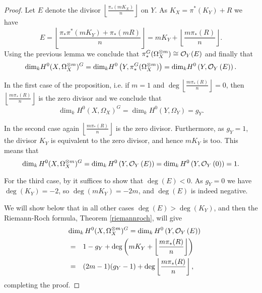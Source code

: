   \begin{proof}

    Let $E$ denote the divisor $\left\lfloor \frac{\pi_*(mK_X)}{n} \right\rfloor$ on $Y$. As $K_X=\pi^*(K_Y)+R$ we have
      \[ E = 
      \left \lfloor \frac{\pi_*\pi^*(mK_Y) + \pi_*(mR)}{n} \right \rfloor =
      mK_Y + \left \lfloor \frac{m\pi_*(R)}{n} \right \rfloor.\]
    Using the previous lemma we conclude that $\pi_*^G(\Omega_X^{\otimes m}) \cong {\cal O}_Y (E)$ and finally that
      \begin{equation*}
	\textrm{dim}_k H^0(X,\Omega_X^{\otimes m})^G 
	 = \textrm{dim}_k H^0\left(Y, \pi_*^G(\Omega_X^{\otimes m})\right)
	  = \textrm{dim}_k H^0\left(Y, {\cal O}_Y\left( E \right) \right).
      \end{equation*}


  In the first case of the proposition, i.e. if $m=1$ and $\deg \left\lfloor\frac{m\pi_*(R)}{n} \right\rfloor=0$, then $\left\lfloor\frac{m\pi_*(R)}{n} \right\rfloor$ is the zero divisor and we conclude that 
    \begin{equation*}
	\dim_kH^0(X,\Omega_X)^G = \dim_kH^0(Y, \Omega_Y) = g_Y.
    \end{equation*}


  In the second case again $\left\lfloor \frac{m\pi_*(R)}{n} \right\rfloor$ is the zero divisor. 
  Furthermore, as $g_Y=1$, the divisor $K_Y$ is equivalent to the zero divisor, and hence $mK_Y$ is too. 
  This means that
    \begin{equation*}
      \dim_kH^0(X,\Omega_X^{\otimes m})^G = \dim_kH^0\left( Y,{\cal O}_Y\left( E \right) \right) 
      = \dim_k  H^0\left( Y,{\cal O}_Y\left( 0 \right) \right)
      = 1.
    \end{equation*}


  For the third case, by \cite[Ex. 1.3.4, Ch IV]{hart} it suffices to show that $\deg \left( E \right) < 0$.
  As $g_Y=0$ we have $\deg(K_Y)=-2$, so $\deg(mK_Y)=-2m$, and $\deg \left( E \right)$ is indeed negative.



  We will show below that in all other cases $\deg(E) > \deg(K_Y)$, and then the Riemann-Roch formula, Theorem \ref{riemannroch}, will give 
     \begin{eqnarray*}
	\lefteqn{\dim_kH^0(X,\Omega_X^{\otimes m})^G = \dim_kH^0\left(Y,\cO_Y\left( E \right)\right)} \\
	& = & 1-g_Y+\deg\left(mK_Y+\left\lfloor{\frac{m\pi_*(R)}{n}}\right\rfloor\right) \\
	& = & (2m-1)(g_Y-1)+\deg\left\lfloor{\frac{m\pi_*(R)}{n}}\right\rfloor,
      \end{eqnarray*}
  completing the proof.



\end{proof}
